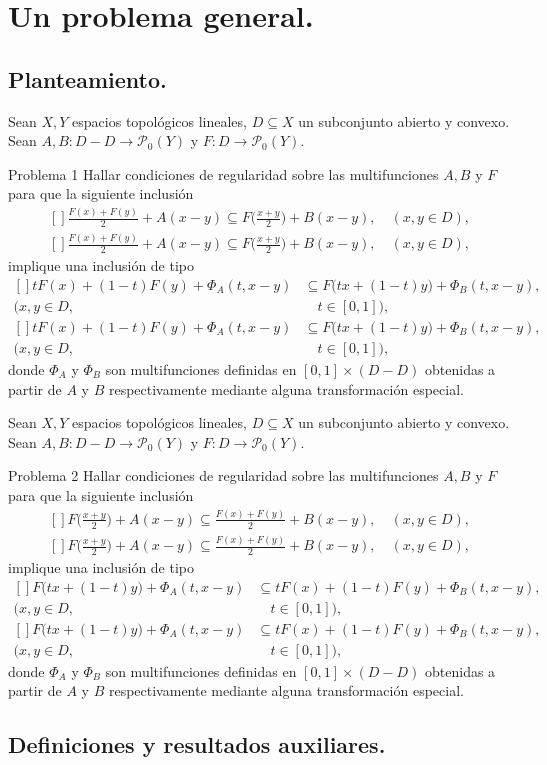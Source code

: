 \documentclass[notheorems,envcountsect,serif,mathserif,professionalfonts,spanish,10pt]{beamer}
\renewcommand{\P}{\mathcal{P}}
\newcommand{\ccvx}[2]{t#1 + (1-t)#2 } %
\newcommand{\cmcvx}[2]{ \frac{#1+#2}2} %
\theoremstyle{definition}
\def\Eq#1#2{\ifthenelse{\equal{#1}{*}}
  {\begin{equation*}\begin{aligned}[]#2\end{aligned}\end{equation*}}
  {\begin{equation}\begin{aligned}[]\label{E#1}#2\end{aligned}\end{equation}}}
\begin{document}
\section{Un problema general.}

\subsection{Planteamiento.}
\begin{frame}
	Sean $X,Y$ espacios topológicos lineales, $D\subseteq X$
	un subconjunto abierto y convexo. Sean $A,B:D-D\to\P_0(Y)$
	y $F:D\to\P_0(Y)$.
	\begin{block}{Problema 1}
		Hallar condiciones de regularidad sobre las multifunciones
		$A,B$ y $F$ para que la siguiente inclusión 
		\Eq{cvxHyp}{
		\cmcvx{F(x)}{F(y)}+A(x-y)
		\subseteq F\bigg(\cmcvx{x}{y}\bigg)+B(x-y),\quad(x,y\in D),
		}
		implique una inclusión de tipo
		\Eq{cvxTh}{
		\ccvx{F(x)}{F(y)}+\Phi_A(t,x-y)
		&\subseteq F\big(\ccvx{x}{y}\big)+\Phi_B(t,x-y),\\
		(x,y\in D,&\quad t\in[0,1]),
		}
		donde $\Phi_A$ y $\Phi_B$ son multifunciones definidas en $[0,1]\times(D-D)$
		obtenidas a partir de $A$ y $B$ respectivamente mediante alguna transformación
		especial.
	\end{block}
\end{frame}

\begin{frame}
	Sean $X,Y$ espacios topológicos lineales, $D\subseteq X$
	un subconjunto abierto y convexo. Sean $A,B:D-D\to\P_0(Y)$
	y $F:D\to\P_0(Y)$.
	\begin{block}{Problema 2}
		Hallar condiciones de regularidad sobre las multifunciones
		$A,B$ y $F$ para que la siguiente inclusión 
		\Eq{cvxHyp}{
		F\bigg(\cmcvx{x}{y}\bigg)+A(x-y)
		\subseteq \cmcvx{F(x)}{F(y)}+B(x-y),\quad(x,y\in D),
		}
		implique una inclusión de tipo
		\Eq{cvxTh}{
		F\big(\ccvx{x}{y}\big)+\Phi_A(t,x-y)
		&\subseteq \ccvx{F(x)}{F(y)}+\Phi_B(t,x-y),\\
		(x,y\in D,&\quad t\in[0,1]),
		}
		donde $\Phi_A$ y $\Phi_B$ son multifunciones definidas en $[0,1]\times(D-D)$
		obtenidas a partir de $A$ y $B$ respectivamente mediante alguna transformación
		especial.
	\end{block}
\end{frame}

\subsection{Definiciones y resultados auxiliares.}
\end{document}

